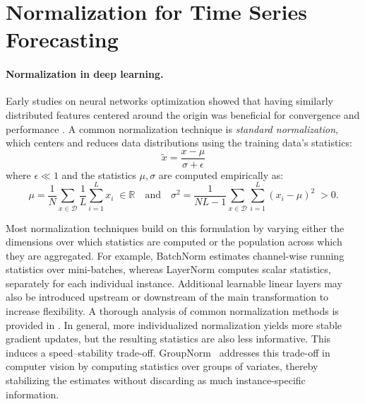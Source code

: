 
\section{Normalization for Time Series Forecasting} \label{related-content}

\paragraph{Normalization in deep learning.} Early studies on neural networks optimization showed that having similarly distributed features centered around the origin was beneficial for convergence and performance
\citep{DBLP:series/lncs/LeCunBOM12}. A common normalization technique is \textit{standard normalization}, which centers and reduces data distributions using the training data's statistics:
\begin{equation}
    \tilde{{x}}=\frac{{x}-{\mu}}{{\sigma}+\epsilon}
\end{equation}
where $\epsilon\ll 1$ and the statistics $\mu,\sigma$ are computed empirically as:
\begin{equation}
    \mu=\frac{1}{N}\sum_{x\in \mathcal{D}}\frac{1}{L}\sum_{i=1}^L x_i \; \in \mathbb{R} \quad \textrm{and} \quad{{\sigma}}^2=\frac{1}{NL-1}\sum_{x\in \mathcal{D}}\sum_{i=1}^L( x_i-\mu)^2 \; >0.
\end{equation}

Most normalization techniques build on this formulation by varying either the dimensions over which statistics are computed or the population across which they are aggregated. For example, BatchNorm \citep{batchnorm} estimates channel-wise running statistics over mini-batches, whereas LayerNorm \citep{layernorm} computes scalar statistics, separately for each individual instance. Additional learnable linear layers may also be introduced upstream or downstream of the main transformation to increase flexibility. A thorough analysis of common normalization methods is provided in \citep{beyondbatchnorm}. In general, more individualized normalization yields more stable gradient updates, but the resulting statistics are also less informative. This induces a speed–stability trade-off. GroupNorm~\citep{groupnorm} addresses this trade-off in computer vision by computing statistics over groups of variates, thereby stabilizing the estimates without discarding as much instance-specific information.

